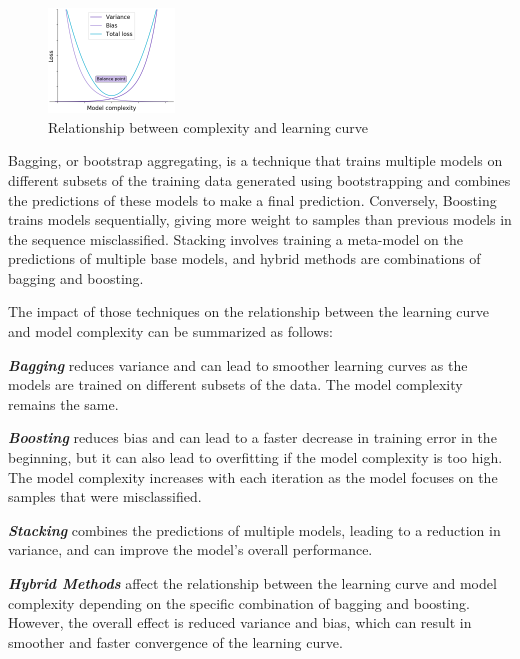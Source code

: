 \begin{figure}
    \centering
    \includegraphics[width=0.30\textwidth]{images/relationship_learningcurve_complexity.png}
    \captionsetup{width=0.30\textwidth}
    \caption[Learning curve and model complexity]{Relationship between complexity and learning curve \cite{Dong2020}}
    \label{relationship_learningcurve_complexity}
    \vspace{-20pt}
\end{figure}

Bagging, or bootstrap aggregating, is a technique that trains multiple models on different subsets of the training data generated using bootstrapping and combines the predictions of these models to make a final prediction. Conversely, Boosting trains models sequentially, giving more weight to samples than previous models in the sequence misclassified. Stacking involves training a meta-model on the predictions of multiple base models, and hybrid methods are combinations of bagging and boosting.

The impact of those techniques on the relationship between the learning curve and model complexity can be summarized as follows:

\textbf{\emph{Bagging}} reduces variance and can lead to smoother learning curves as the models are trained on different subsets of the data. The model complexity remains the same.

\textbf{\emph{Boosting}} reduces bias and can lead to a faster decrease in training error in the beginning, but it can also lead to overfitting if the model complexity is too high. The model complexity increases with each iteration as the model focuses on the samples that were misclassified.

\textbf{\emph{Stacking}} combines the predictions of multiple models, leading to a reduction in variance, and can improve the model's overall performance.

\textbf{\emph{Hybrid Methods}} affect the relationship between the learning curve and model complexity depending on the specific combination of bagging and boosting. However, the overall effect is reduced variance and bias, which can result in smoother and faster convergence of the learning curve.

